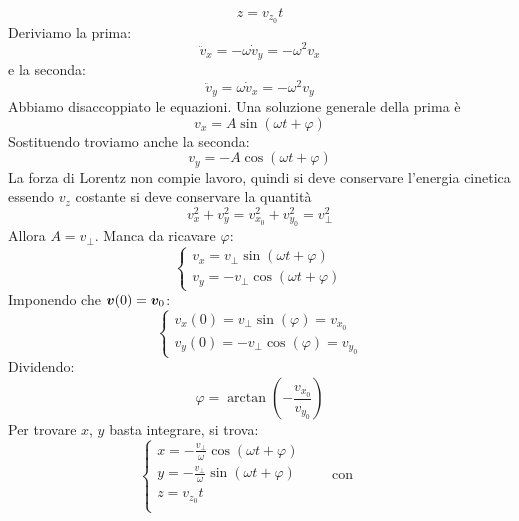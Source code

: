 \begin{Es}
\begin{equation*}z=v_{z_0}t\end{equation*}
Deriviamo la prima:
\begin{equation*}\ddot v_x=-\omega\dot v_y=-\omega^2 v_x\end{equation*}
e la seconda:
\begin{equation*}\ddot v_y=\omega\dot v_x=-\omega^2 v_y\end{equation*}
Abbiamo disaccoppiato le equazioni. Una soluzione generale della prima è 
\begin{equation*}v_x=A\sin\left(\omega t+\varphi\right)\end{equation*}
Sostituendo troviamo anche la seconda:
\begin{equation*}v_y=-A\cos\left(\omega t+\varphi\right)\end{equation*}
La forza di Lorentz non compie lavoro, quindi si deve conservare l'energia cinetica essendo $v_z$ costante si deve conservare la quantità 
\begin{equation*}v_x^2+v_y^2=v_{x_0}^2+v_{y_0}^2=v_\perp^2\end{equation*}
Allora $A=v_\perp$. Manca da ricavare $\varphi$:
\begin{equation*}\left\{\begin{array}{l}
v_x=v_\perp\sin\left(\omega t+\varphi\right)\\
v_y=-v_\perp\cos\left(\omega t+\varphi\right)
\end{array}\right.\end{equation*}
Imponendo che $\boldsymbol{v}(0)=\boldsymbol{v}_0$:
\begin{equation*}\left\{\begin{array}{l}
v_x(0)=v_\perp\sin\left(\varphi\right)=v_{x_0}\\
v_y(0)=-v_\perp\cos\left(\varphi\right)=v_{y_0}
\end{array}\right.\end{equation*}
Dividendo:
\begin{equation*}\varphi=\arctan{\left(-\frac{v_{x_0}}{v_{y_0}}\right)}\end{equation*}
Per trovare $x$, $y$ basta integrare, si trova:
\begin{equation*}\left\{
\begin{array}{l}
x=-\frac{v_\perp}{\omega}\cos\left(\omega t+\varphi\right)\\
y=-\frac{v_\perp}{\omega}\sin\left(\omega t+\varphi\right)\\
z=v_{z_0}t\\
\end{array}\right.\qquad\text{con}\qquad

\end{equation*}
\end{Es}
